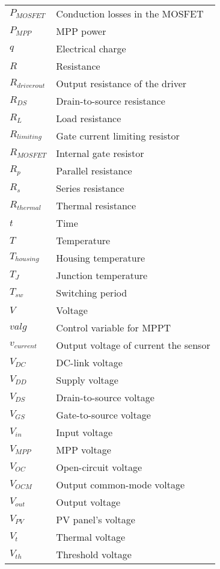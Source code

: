 \begin{tabular}{ll}
$P_{MOSFET}$ & Conduction losses in the MOSFET \\
$P_{MPP}$ & MPP power \\
$q$ & Electrical charge \\
$R$ & Resistance\\
$R_{driver out}$ & Output resistance of the driver\\
$R_{DS}$ & Drain-to-source resistance\\
$R_{L}$ & Load resistance\\
$R_{limiting}$ & Gate current limiting resistor\\ 
$R_{MOSFET}$ & Internal gate resistor\\
$R_{p}$ & Parallel resistance \\
$R_{s}$ & Series resistance \\
$R_{thermal}$ & Thermal resistance\\
$t$ & Time\\
$T$ & Temperature \\
$T_{housing}$ & Housing temperature \\
$T_{J}$ & Junction temperature \\
$T_{sw}$ & Switching period \\
$V$ & Voltage\\
$valg$ & Control variable for MPPT \\
$v_{current}$ & Output voltage of current the sensor \\
$V_{DC}$ & DC-link voltage \\
$V_{DD}$ & Supply voltage\\
$V_{DS}$ & Drain-to-source voltage\\
$V_{GS}$ & Gate-to-source voltage\\
$V_{in}$ & Input voltage \\
$V_{MPP}$ & MPP voltage\\
$V_{OC}$ & Open-circuit voltage\\
$V_{OCM}$ & Output common-mode voltage \\
$V_{out}$ & Output voltage \\
$V_{PV}$ & PV panel's voltage \\
$V_{t}$ & Thermal voltage \\
$V_{th}$ & Threshold voltage \\
\end{tabular}

